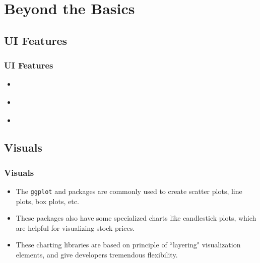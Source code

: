 \documentclass[
	11pt, %
]{beamer}
\begin{document}


\section{Beyond the Basics}

%	
%	

\subsection{UI Features}
\begin{frame}
	\frametitle{UI Features}
	
	\begin{itemize}
		\item\href{https://shiny.rstudio.com/gallery/widget-gallery.html}{\color{blue}{Widgets}}
		\item \href{http://shinyapps.dreamrs.fr/shinyWidgets/}{\color{blue}{Even more widgets}}
		\item \href{https://shiny.rstudio.com/articles/progress.html}{\color{blue}{Progress bars}}
		\end{itemize}
\end{frame}




\subsection{Visuals}

\begin{frame}
	\frametitle{Visuals}
	
	\begin{itemize}
		\item The \texttt{ggplot} and \href{https://plotly.com/r/}{} packages are commonly used to create scatter plots, line plots, box plots, etc.
		\item These packages also have some specialized charts like candlestick plots, which are helpful for visualizing stock prices.
		\item These charting libraries are based on principle of ``layering" visualization elements, and give developers tremendous flexibility.
	\end{itemize}
\end{frame}
\end{document}
